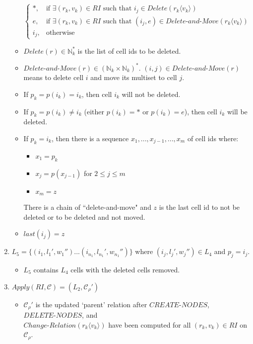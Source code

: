 \documentclass{article}
\newcommand{\mn}{\text{-}}
\begin{document}
\begin{enumerate}
\begin{itemize}
\[\begin{cases}
                           *  , & \text{if } \exists(r_k,v_k)\in RI \text{ such that } i_j \in Delete(r_k\langle v_k\rangle)\\
                           e  , & \text{if } \exists(r_k,v_k)\in RI \text{ such that } (i_j,e) \in Delete\mn and\mn Move(r_k\langle v_k\rangle)\\
                           i_j, & \text{otherwise} 
                           \end{cases}\] 
         \item $Delete(r) \in \mathbb{N}_k^*$ is the list of cell ids to be deleted.
         \item $Delete\mn and\mn Move(r) \in (\mathbb{N}_k \times \mathbb{N}_k)^*$. $(i,j) \in Delete\mn and\mn Move(r)$ means to delete cell $i$ and move its multiset to
               cell $j$.
         \item If $p_k = p(i_k) = i_k$, then cell $i_k$ will not be deleted.
         \item If $p_k = p(i_k) \neq i_k$ (either $p(i_k)= *$ or $p(i_k)=e$), then cell $i_k$ will be deleted.
         \item If $p_k = i_k$, then there is a sequence $x_1,...,x_{j-1},...,x_m$ of cell ids where:
               \begin{itemize}
                  \item $x_1 = p_k$
                  \item $x_j = p(x_{j-1})$ for $2 \leq j \leq m$
                  \item $x_m = z$ 
               \end{itemize}
               There is a chain of ``delete-and-move" and $z$ is the last cell id to not be deleted or to be deleted and not moved.
         \item $last(i_j) = z$
         \end{itemize}
   \item $L_5 = \{(i_1,l_1',w_1'')...(i_{n_1},l_{n_1}',w_{n_1}'')\}$ where $(i_j,l_j',w_j'') \in L_4$ and $p_j = i_j$. 
         \begin{itemize}
         \item $L_5$ contains $L_4$ cells with the deleted cells removed.
         \end{itemize}
   \item $Apply(RI,\mathcal{C}) = (L_2, \mathcal{C}_{\rho}')$
         \begin{itemize}
         \item $\mathcal{C}_{\rho}'$ is the updated `parent' relation after $CREATE\mn NODES$, $DELETE\mn NODES$, and\\ $Change\mn Relation(r_k\langle v_k\rangle)$ have been computed
               for all $(r_k,v_k) \in RI$ on $\mathcal{C}_{\rho}$.
         \end{itemize}
\end{enumerate}
\end{document}
